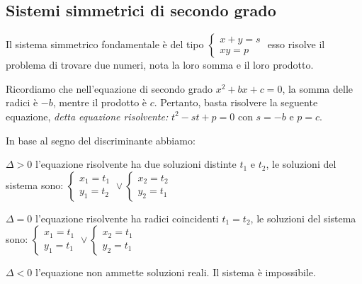 \subsection{Sistemi simmetrici di secondo grado}
Il sistema simmetrico fondamentale è del tipo 
$\left\{\begin{array}{l}{x+y=s}\\{xy=p}\end{array}\right.$ esso risolve il 
problema di trovare due numeri, nota la loro somma e il loro prodotto.

Ricordiamo che nell'equazione di secondo grado $x^2+bx+c=0$, la somma delle 
radici è $-b$, mentre il prodotto è $c$. Pertanto, basta risolvere la seguente 
equazione, \emph{detta equazione risolvente: } $t^2-st+p=0$ con $s=-b$ e $p=c$.

In base al segno del discriminante abbiamo:
\begin{itemize*}
\item $\Delta >0$ l'equazione risolvente ha due soluzioni distinte $ t_1 $ e $ 
t_2 $, le soluzioni del sistema sono: 
$\left\{\begin{array}{l}{x_1=t_1}\\{y_1=t_2}\end{array}\right.\vee 
\left\{\begin{array}{l}{x_2=t_2}\\{y_2=t_1}\end{array}\right.$
\item $\Delta =0$ l'equazione risolvente ha radici coincidenti $t_1=t_2$, le 
soluzioni del sistema sono: 
$\left\{\begin{array}{l}{x_1=t_1}\\{y_1=t_1}\end{array}\right.\vee 
\left\{\begin{array}{l}{x_2=t_1}\\{y_2=t_1}\end{array}\right.$
\item $\Delta <0$ l'equazione non ammette soluzioni reali. Il sistema è 
impossibile.
\end{itemize*}

